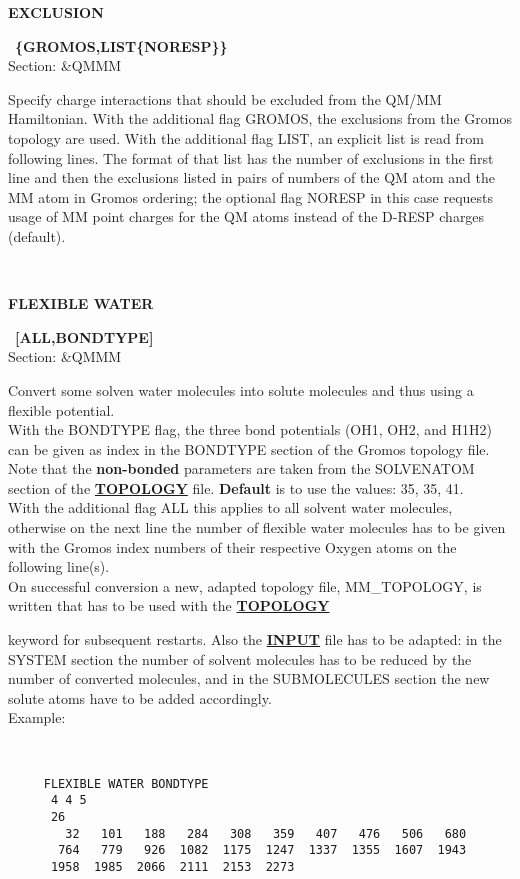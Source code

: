 \documentclass[twoside,10pt,titlepage,a4paper]{article}
\newcommand{\referto}[2]{\hyperlink{#1}{#2}}
\newcommand{\reflabel}[1]{\hypertarget{#1}}
\newcommand{\referto}[2]{\htmlref{#2}{#1}}
\newcommand{\reflabel}[1]{\label{#1}}
\newcommand{\keyword}[5]{%
\vspace{1.0cm}
\begin{minipage}{15cm}
\reflabel{#1}{\textbf{\large #1}}%
\index{#1}%
\ \textbf{#2}%
\ \textbf{#3}%
\ \textit{#4}%
     \hfill\\\smallskip
     {Section: #5}
     \hfill\\\smallskip\vskip 10pt
\end{minipage}
}%
\newcommand{\refkeyword}[1]{%
\referto{#1}{\textbf{#1}}%
\index{#1}%
}%
\newcommand{\desc}[1]{%
   \hspace*{\fill} \parbox{130mm}{\sloppy
                          {#1}%
                             }
     \hfill\\\smallskip
   }%
\newcommand{\desc}[1]{#1\vspace{1ex}}
\begin{document}
\keyword{EXCLUSION}{\{GROMOS,LIST\{NORESP\}\}}{}{}{\&QMMM}
\desc{Specify charge interactions that should be excluded
   from the QM/MM Hamiltonian. With the additional flag GROMOS,
   the exclusions from the Gromos topology are used. With the
   additional flag LIST, an explicit list is read from following lines.
   The format of that list has the number of exclusions in the first
   line and then the exclusions listed in pairs of numbers of the QM
   atom and the MM atom in Gromos ordering; the optional flag NORESP
   in this case requests usage of MM point charges for the QM atoms 
   instead of the D-RESP charges (default).}


\keyword{FLEXIBLE WATER}{[ALL,BONDTYPE]}{}{}{\&QMMM}
\desc{Convert some solven water molecules into solute molecules and
  thus using a flexible potential.\\
  With the BONDTYPE flag, the three bond potentials (OH1, OH2, and H1H2)
  can be given as index in the BONDTYPE section of the Gromos topology
  file. Note that the {\bf non-bonded} parameters are taken from the
  SOLVENATOM section of the \refkeyword{TOPOLOGY} file.
  {\bf Default} is to use the values: 35, 35, 41.\\
  With the additional flag ALL this applies to all solvent water
  molecules, otherwise on the next line the number of flexible water
  molecules has to be given with the Gromos index numbers of their
  respective Oxygen atoms on the following line(s).\\
  On successful conversion a new, adapted topology file, MM\_TOPOLOGY,
  is written that has to be used with the \refkeyword{TOPOLOGY}
  keyword for subsequent restarts. Also the \refkeyword{INPUT} file
  has to be adapted: in the SYSTEM section the number of solvent
  molecules has to be reduced by the number of converted molecules,
  and in the SUBMOLECULES section the new solute atoms have to be
  added accordingly.\\ Example:}
\begin{verbatim}
     FLEXIBLE WATER BONDTYPE
      4 4 5
      26
        32   101   188   284   308   359   407   476   506   680
       764   779   926  1082  1175  1247  1337  1355  1607  1943
      1958  1985  2066  2111  2153  2273
\end{verbatim}
\end{document}
